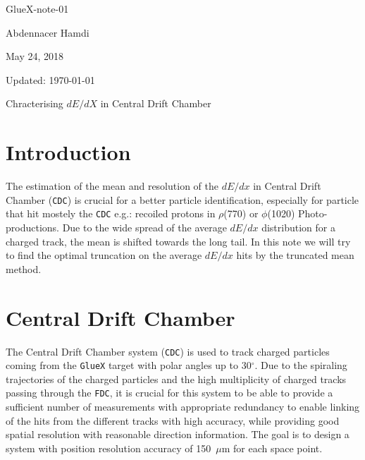 \documentclass[12pt]{article}
\begin{document}
\hfill GlueX-note-01

\hfill Abdennacer Hamdi

\hfill May 24, 2018

\hfill Updated: \today

\vskip 2.0cm

\begin{center}
{\LARGE Chracterising $dE/dX$ in Central Drift Chamber}\\[10pt]
\end{center}

\vskip 2.0cm


%
\section{Introduction}

The estimation of the mean and resolution of the $dE/dx$ in Central Drift Chamber ({\tt CDC}) is crucial for a better particle identification, especially for particle that hit mostely the
{\tt CDC} e.g.: recoiled protons in $\rho$(770) or $\phi$(1020) Photo-productions. Due to the wide spread of the average $dE/dx$ distribution for a charged track, the mean is shifted 
towards the long tail. In this note we will try to find the optimal truncation on the average $dE/dx$ hits by the truncated mean method.

\section{Central Drift Chamber}

The Central Drift Chamber system ({\tt CDC}) is used to track charged particles coming from the {\tt GlueX} target with polar angles up to 30$^{\circ}$. 
Due to the spiraling trajectories of the charged particles and the high multiplicity of charged tracks passing through the {\tt FDC}, 
it is crucial for this system to be able to provide a sufficient number of measurements with appropriate redundancy to enable linking of the hits from the different tracks
with high accuracy, while providing good spatial resolution with reasonable direction information.  The goal is to design a system with position resolution accuracy of 150~$\mu$m
for each space point.
\end{document}
